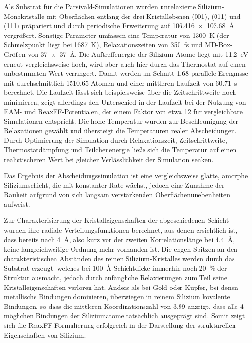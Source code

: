 Als Substrat für die Parsivald-Simulationen wurden unrelaxierte Silizium-Monokristalle mit Oberflächen entlang der drei Kristallebenen (001), (011) und (111) präpariert und durch periodische Erweiterung auf \SI{106.416x103.68}{\angstrom} vergrößert.
Sonstige Parameter umfassen eine Temperatur von \SI{1300}{\kelvin} (der Schmelzpunkt liegt bei \SI{1687}{\kelvin}), Relaxationszeiten von \SI{350}{\femto\second} und MD-Box-Größen von \SI{37x37}{\angstrom}.
Die Auftreffenergie der Silizium-Atome liegt mit \SI{11.2}{\electronvolt} erneut vergleichsweise hoch, wird aber auch hier durch das Thermostat auf einen unbestimmten Wert verringert.
Damit werden im Schnitt \num{1.68} parallele Ereignisse mit durchschnittlich \num{1510.65} Atomen und einer mittleren Laufzeit von \SI{60.71}{\second} berechnet.
Die Laufzeit lässt sich beispielsweise über die Zeitschrittweite noch minimieren, zeigt allerdings den Unterschied in der Laufzeit bei der Nutzung von EAM- und ReaxFF-Potentialen, der einem Faktor von etwa \num{12} für vergleichbare Simulationen entspricht.
Die hohe Temperatur wurden zur Beschleunigung der Relaxationen gewählt und übersteigt die Temperaturen realer Abscheidungen.
Durch Optimierung der Simulation durch Relaxationszeit, Zeitschrittweite, Thermostatdämpfung und Teilchenenergie ließe sich die Temperatur auf einen realistischeren Wert bei gleicher Verlässlichkeit der Simulation senken.

Das Ergebnis der Abscheidungssimulation ist eine vergleichsweise glatte, amorphe Siliziumschicht, die mit konstanter Rate wächst, jedoch eine Zunahme der Rauheit aufgrund von sich langsam verstärkenden Oberflächenunebenheiten aufweist.

Zur Charakterisierung der Kristalleigenschaften der abgeschiedenen Schicht wurden ihre radiale Verteilungsfunktionen berechnet, aus denen ersichtlich ist, dass bereits nach \SI{4}{\angstrom}, also kurz vor der zweiten Korrelationslänge bei \SI{4.4}{\angstrom}, keine langreichweitige Ordnung mehr vorhanden ist.
Die engen Spitzen an den charakteristischen Abständen des reinen Silizium-Kristalles werden durch das Substrat erzeugt, welches bei \SI{100}{\angstrom} Schichtdicke immerhin noch \SI{20}{\percent} der Struktur ausmacht, jedoch durch anfängliche Relaxierungen zum Teil seine Kristalleigenschaften verloren hat.
Anders als bei Gold oder Kupfer, bei denen metallische Bindungen dominieren, überwiegen in reinem Silizium kovalente Bindungen, so dass die mittleren Koordinationszahl von \num{3.99} anzeigt, dass alle 4 möglichen Bindungen der Siliziumatome tatsächlich ausgeprägt sind.
Somit zeigt sich die ReaxFF-Formulierung erfolgreich in der Darstellung der strukturellen Eigenschaften von Silizium.

